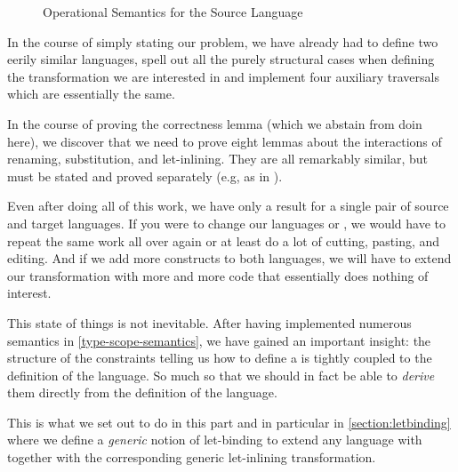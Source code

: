 \begin{figure}[h]
\caption{Operational Semantics for the Source Language\label{fig:opersem}}
\end{figure}

In the course of simply stating our problem, we have already had to define two
eerily similar languages, spell out all the purely structural cases when defining
the transformation we are interested in and implement four auxiliary traversals
which are essentially the same.

In the course of proving the correctness lemma (which we abstain from doin here),
we discover that we need to prove eight lemmas about the interactions of renaming,
substitution, and let-inlining. They are all remarkably similar, but must be stated
and proved separately (e.g, as in \cite{benton2012strongly}).

Even after doing all of this work, we have only a result for a single pair of
source and target languages. If you were to change our languages  or
, we would have to repeat the same work all over again or at least do a
lot of cutting, pasting, and editing. And if we add more constructs to both
languages, we will have to extend our transformation with more and more code
that essentially does nothing of interest.

This state of things is not inevitable. After having implemented numerous
semantics in \cref{type-scope-semantics}, we have gained an important insight:
the structure of the constraints telling us how to define a  is
tightly coupled to the definition of the language. So much so that we should
in fact be able to \emph{derive} them directly from the definition of the
language.

This is what we set out to do in this part and in particular in \cref{section:letbinding}
where we define a \emph{generic} notion of let-binding to extend any language
with together with the corresponding generic let-inlining transformation.
